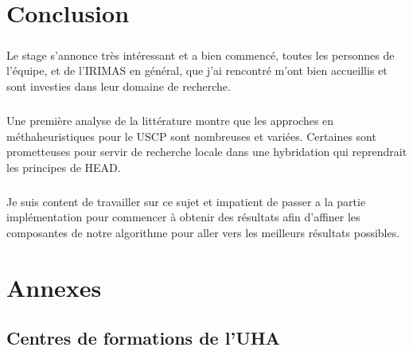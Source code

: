\documentclass[a4paper,11pt,twoside,french,report]{../common/simplem}
\begin{document}
	\chapter*{Conclusion}
		\paragraph*{}
			Le stage s'annonce très intéressant et a bien commencé, toutes les personnes de l'équipe, et de l'\gls{IRIMAS} en général, que j'ai rencontré m'ont bien accueillis et sont investies dans leur domaine de recherche.
		\paragraph*{}
			Une première analyse de la littérature montre que les approches en méthaheuristiques pour le \gls{USCP} sont nombreuses et variées. Certaines sont prometteuses pour servir de recherche locale dans une hybridation qui reprendrait les principes de \gls{HEAD}.
		\paragraph*{}
			Je suis content de travailler sur ce sujet et impatient de passer a la partie implémentation pour commencer à obtenir des résultats afin d'affiner les composantes de notre algorithme pour aller vers les meilleurs résultats possibles.
	\printbibliography[heading=bibintoc]{}
	\printglossary[type=\acronymtype,title=Lexique,toctitle=Lexique]{}
	\chapter*{Annexes}
		\setcounter{section}{0}
		\renewcommand{\thesection}{\Alph{section}}
		\renewcommand{\theHsection}{appendixsection.\Alph{section}}
		\section{Centres de formations de l'\acrshort{UHA}}\label{sec:uha_formation}
			\paragraph*{}
				
				\hfill\\
			\paragraph*{}
				
				\hfill\\
\end{document}
